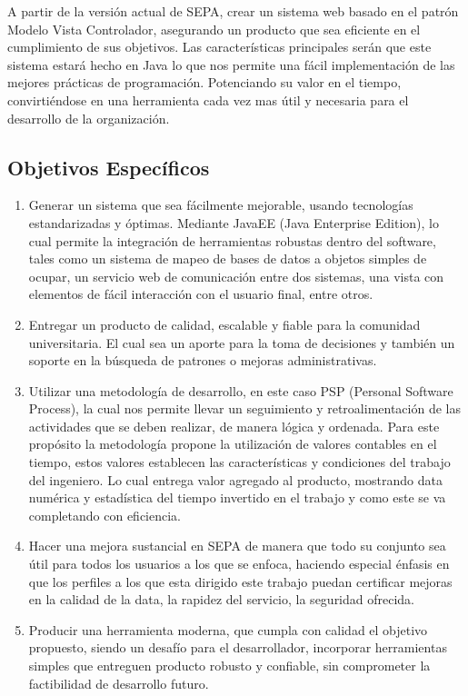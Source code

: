 \documentclass[a4paper,12pt,openany,oneside]{book}
\begin{document}
A partir de la versión actual de SEPA, crear un sistema web basado en el patrón Modelo Vista Controlador, asegurando un producto que sea eficiente en el cumplimiento de sus objetivos. Las características principales serán que este sistema estará hecho en Java lo que nos permite una fácil implementación de las mejores prácticas de programación. Potenciando su valor en el tiempo, convirtiéndose en una herramienta cada vez mas útil y necesaria para el desarrollo de la organización.

\subsection{Objetivos Específicos}
\begin{enumerate}
	\item Generar un sistema que sea fácilmente mejorable, usando tecnologías estandarizadas y óptimas. Mediante JavaEE (Java Enterprise Edition), lo cual permite la integración de herramientas robustas dentro del software, tales como un sistema de mapeo de bases de datos a objetos simples de ocupar, un servicio web de comunicación entre dos sistemas, una vista con elementos de fácil interacción con el usuario final, entre otros.
	\item Entregar un producto de calidad, escalable y fiable para la comunidad universitaria. El cual sea un aporte para la toma de decisiones y también un soporte en la búsqueda de patrones o mejoras administrativas.
	\item Utilizar una metodología de desarrollo, en este caso PSP (Personal Software Process), la cual nos permite llevar un seguimiento y retroalimentación de las actividades que se deben realizar, de manera lógica y ordenada. Para este propósito la metodología propone la utilización de valores contables en el tiempo, estos valores establecen las características y condiciones del trabajo del ingeniero. Lo cual entrega valor agregado al producto, mostrando data numérica y estadística del tiempo invertido en el trabajo y como este se va completando con eficiencia.
	\item Hacer una mejora sustancial en SEPA de manera que todo su conjunto sea útil para todos los usuarios a los que se enfoca, haciendo especial énfasis en que los perfiles a los que esta dirigido este trabajo puedan certificar mejoras en la calidad de la data, la rapidez del servicio, la seguridad ofrecida.  
	\item Producir una herramienta moderna, que cumpla con calidad el objetivo propuesto, siendo un desafío para el desarrollador, incorporar herramientas simples que entreguen producto robusto y confiable, sin comprometer la factibilidad de desarrollo futuro.
\end{enumerate}
\end{document}
